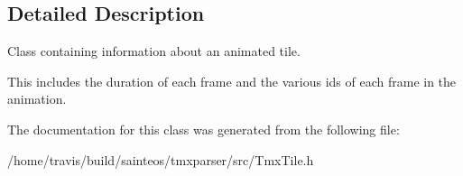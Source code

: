 \subsection{Detailed Description}
Class containing information about an animated tile. 

This includes the duration of each frame and the various ids of each frame in the animation. 

The documentation for this class was generated from the following file\-:\begin{DoxyCompactItemize}
\item 
/home/travis/build/sainteos/tmxparser/src/Tmx\-Tile.\-h\end{DoxyCompactItemize}
